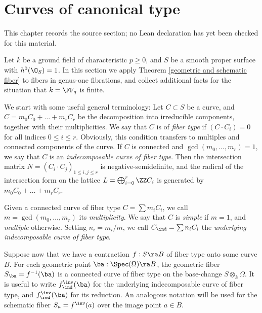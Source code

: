 \chapter{Curves of canonical  type}
\label{no-enriques-surface-over-the-integers-chapter-04}

\begin{remark}
\label{no-enriques-surface-over-the-integers-chapter-04-source}
This chapter records the source section; no Lean declaration has yet been checked for this material.
\notready
\end{remark}

\label{Curves}

Let $k$ be a ground field of characteristic $p\geq 0$, and $S$ be a smooth proper surface with $h^0(\O_S)=1$.
In this section we apply Theorem \ref{geometric and schematic fiber} to fibers in genus-one fibrations,
and collect additional facts for the situation that $k=\FF_q$ is finite.

We start with  some useful general terminology:
Let $C\subset S$ be a curve, and  $C=m_0C_0+\ldots+m_rC_r$ be the decomposition into irreducible components, together with
their multiplicities.
We say that $C$ is of \emph{fiber type} if
$(C\cdot C_i)= 0$ for all indices  $0\leq i\leq r$.
Obviously, this condition transfers to multiples and connected components of the curve.
If $C$ is connected and $\gcd(m_0,\ldots,m_r)=1$, we say that
$C$ is an \emph{indecomposable curve of fiber type}.
Then the intersection matrix $N=(C_i\cdot C_j)_{1\leq i,j\leq r}$ is negative-semidefinite,
and   the radical of
the intersection form on the lattice $L=\bigoplus_{i=0}^r \ZZ C_i$ is generated by $m_0C_0+\ldots+m_rC_r$.

Given a connected curve  of fiber type $C=\sum m_iC_i$, we call $m=\gcd(m_0,\ldots,m_r)$ its \emph{multiplicity}.
We say that $C$ is \emph{simple} if $m=1$, and \emph{multiple} otherwise.
Setting $n_i=m_i/m$, we call  $C_\ind=\sum n_iC_i$ the \emph{underlying indecomposable curve of fiber type}.

Suppose now that we have a contraction $f:S\ra B$ of fiber type onto some curve $B$.
For each geometric point $\ba:\Spec(\Omega)\ra B$, the geometric fiber $S_\ba=f^{-1}(\ba)$ is a connected
curve of fiber type on the base-change $S\otimes_k\Omega$. It is useful to write $f^\inv_\ind(\ba)$ for the underlying
indecomposable curve of fiber type, and $f^\inv_\red(\ba)$ for its reduction.
An analogous notation will be used for  the schematic fiber $S_a=f^\inv(a)$
over the image point $a\in B$.

